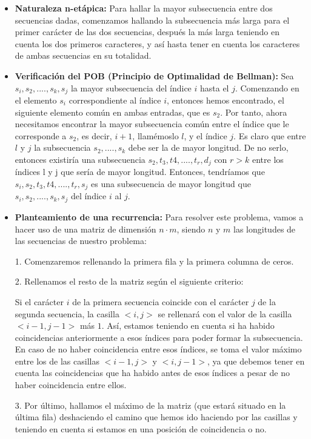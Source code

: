\documentclass[10pt,a4paper]{article}
\begin{document}
\begin{itemize}
	\item \textbf{Naturaleza n-etápica:} Para hallar la mayor subsecuencia entre dos secuencias dadas, comenzamos hallando la subsecuencia más larga para el primer carácter de las dos secuencias, después la más larga teniendo en cuenta los dos primeros caracteres, y así hasta tener en cuenta los caracteres de ambas secuencias en su totalidad.
	\item \textbf{Verificación del POB (Principio de Optimalidad de Bellman):} Sea $ s_i, s_2,...., s_k, s_j$ la mayor subsecuencia del índice \(i\) hasta el \(j\).
	Comenzando en el elemento $s_i$ correspondiente al índice $i$, entonces hemos encontrado, el siguiente elemento común en ambas entradas, que es $s_2$. Por tanto, ahora necesitamos encontrar la mayor subsecuencia común entre el índice que le corresponde a $s_2$, es decir, $i+1$, llamémoslo $l$, y el índice $j$. Es claro que entre $l$ y $j$ la subsecuencia $s_2,...., s_k$ debe ser la de mayor longitud. De no serlo, entonces existiría una subsecuencia $s_2, t_3, t4, ...., t_r, d_j$ con $r>k$ entre los índices l y j que sería de mayor longitud. Entonces, tendríamos que $s_i, s_2, t_3, t4, ...., t_r, s_j$ es una subsecuencia de mayor longitud que $ s_i, s_2,...., s_k, s_j$ del índice $i$ al $j$.
	\item \textbf{Planteamiento de una recurrencia:} Para resolver este problema, vamos a hacer uso de una matriz de dimensión $n \cdot m$, siendo $n$ y $m$ las longitudes de las secuencias de nuestro problema: 
	
	1. Comenzaremos rellenando la primera fila y la primera columna de ceros.
	
	2. Rellenamos el resto de la matriz según el siguiente criterio:
	
	Si el carácter $i$ de la primera secuencia coincide con el carácter $j$ de la segunda secuencia, la casilla $<i,j>$ se rellenará con el valor de la casilla $<i-1,j-1>$ más $1$. Así, estamos teniendo en cuenta si ha habido coincidencias anteriormente a esos índices para poder formar la subsecuencia. En caso de no haber coincidencia entre esos índices, se toma el valor máximo entre los de las casillas $<i-1,j>$ y $<i,j-1>$, ya que debemos tener en cuenta las coincidencias que ha habido antes de esos índices a pesar de no haber coincidencia entre ellos.
	
	3. Por último, hallamos el máximo de la matriz (que estará situado en la última fila) deshaciendo el camino que hemos ido haciendo por las casillas y teniendo en cuenta si estamos en una posición de coincidencia o no.
	

\end{itemize}
\end{document}
